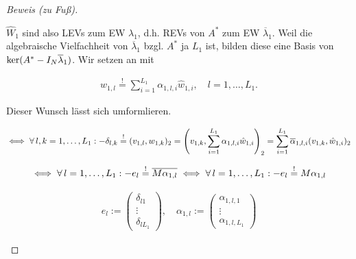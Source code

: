 \begin{proof}[Beweis (zu Fuß)]
\begin{enumerate}[label = (\roman*)]
        $\hat W_1$ sind also LEVs zum EW $\lambda_1$, d.h. REVs von $A^\ast$ zum EW $\overline \lambda_1$.
        Weil die algebraische Vielfachheit von $\overline \lambda_1$ bzgl. $A^\ast$ ja $L_1$ ist, bilden diese eine Basis von $\operatorname{ker}(A^\ast - I_N \overline \lambda_1)$.
        Wir setzen an mit

        \begin{align*}
            w_{1, l}
            \stackrel{!}{=}
            \sum_{i=1}^{L_1}
                \alpha_{1, l, i} \hat w_{1, i},
            \quad
            l = 1, \dots, L_1.
        \end{align*}

        Dieser Wunsch lässt sich umformlieren.

        \begin{align*}
            \iff
            \forall \, l, k = 1, \dots, L_1:
                -\delta_{l, k}
                \stackrel{!}{=}
                (v_{1, l}, w_{1, k})_2
                =
                {\left ( 
                    v_{1, k},
                    \sum_{i=1}^{L_1}
                        \alpha_{1, l, i} \hat w_{1, i}
                 \right )}_2
                =
                \sum_{i=1}^{L_1}
                    \overline \alpha_{1, l, i} (v_{1, k}, \hat w_{1, i})_2
        \end{align*}

        \begin{align*}
            \iff
            \forall \, l = 1, \dots, L_1:
                -e_l
                \stackrel{!}{=}
                \overline{M \alpha_{1, l}}
            \iff
            \forall \, l = 1, \dots, L_1:
                -e_l
                \stackrel{!}{=}
                M \alpha_{1, l}    
        \end{align*}

        \begin{align*}
            e_l
            :=
            \begin{pmatrix}
                \delta_{l 1} \\ \vdots \\ \delta_{l L_1}
            \end{pmatrix},
            \quad
            \alpha_{1, l}
            :=
            \begin{pmatrix}
                \alpha_{1, l, 1} \\ \vdots \\ \alpha_{1, l, L_1}
            \end{pmatrix}
        \end{align*}


\end{enumerate}
\end{proof}
